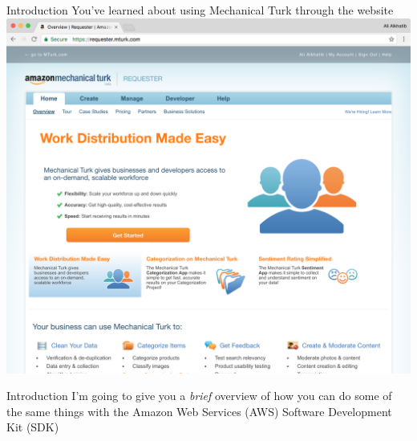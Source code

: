 \documentclass[presentation]{subfiles}
\begin{document}
\begin{frame}{Introduction}
  You've learned about using Mechanical Turk through the website
  \includegraphics[width=\textwidth]{figures/amt_gui.png}
\end{frame}

\begin{frame}{Introduction}
  I'm going to give you a \emph{brief} overview of how you can do some of the same things
  with the Amazon Web Services (AWS) Software Development Kit (SDK)
\end{frame}
\end{document}

